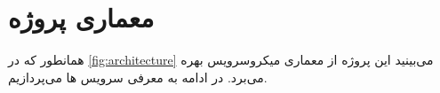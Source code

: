 \chapter{معماری پروژه}


همانطور که در {\ref{fig:architecture}} می‌بینید این پروژه از معماری میکروسرویس بهره می‌برد.
در ادامه به معرفی سرویس ها می‌پردازیم.




\newpage



\newpage



\newpage



\newpage

